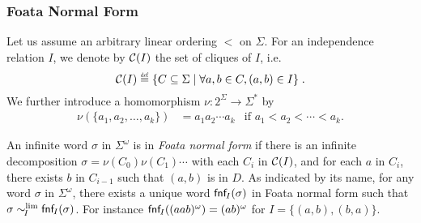 \documentclass[11pt,reqno,a4paper]{amsart}
\newcommand{\eqdef}{\stackrel{\raisebox{-.15ex}{\scalebox{.5}{\upshape\textrm{def}}}}{=}}
\theoremstyle{plain}
\theoremstyle{definition}
\theoremstyle{remark}
\renewcommand{\paragraph}{\subsubsection*}
\begin{document}
\paragraph{Foata Normal Form}
Let us assume an arbitrary linear ordering $<$ on $\Sigma$.  For an
independence relation $I$, we denote by $\mathcal{C}(I)$ the set of cliques of
$I$, i.e.\
\begin{equation*}
  \clq(I)\eqdef\{C\subseteq\Sigma\mid\forall a,b\in C, (a,b)\in I\}\;.
\end{equation*}
We further introduce a homomorphism
$\nu:2^\Sigma\rightarrow\Sigma^\ast$ by
\begin{align*}
  \nu(\{a_1,a_2,\dots,a_k\})&= a_1a_2\cdots a_k&\!\text{if
  }a_1<a_2<\cdots<a_k.
\end{align*}

An infinite word $\sigma$ in $\Sigma^\omega$ is in \emph{Foata normal
form} \citep[see e.g.][]{inftr} if there is an infinite decomposition
$\sigma=\nu(C_0)\nu(C_1)\cdots$ with each $C_i$ in $\mathcal{C}(I)$, and for
each $a$ in $C_i$, there exists $b$ in $C_{i-1}$ such that $(a,b)$ is in
$D$.  As indicated by its name, for any word $\sigma$ in
$\Sigma^\omega$, there exists a unique word $\mathsf{fnf}_{\!I}(\sigma)$ in Foata
normal form such that $\sigma\mathrel{\sim_{\!I}^\mathrm{lim}}\mathsf{fnf}_{\!I}(\sigma)$.  For instance
$\mathsf{fnf}_{\!I}((aab)^\omega)=(ab)^\omega$ for $I=\{(a,b),(b,a)\}$.
\end{document}
